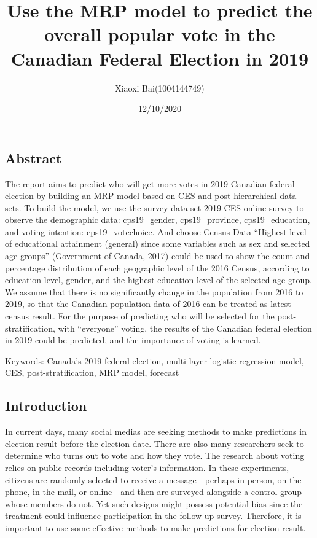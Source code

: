 \documentclass[
]{article}
\title{Use the MRP model to predict the overall popular vote in the Canadian
Federal Election in 2019}
\author{Xiaoxi Bai(1004144749)}
\date{12/10/2020}
\begin{document}
\maketitle

\hypertarget{abstract}{%
\subsection{Abstract}\label{abstract}}

The report aims to predict who will get more votes in 2019 Canadian
federal election by building an MRP model based on CES and
post-hierarchical data sets. To build the model, we use the survey data
set 2019 CES online survey to observe the demographic data:
cps19\_gender, cps19\_province, cps19\_education, and voting intention:
cps19\_votechoice. And choose Census Data ``Highest level of educational
attainment (general) since some variables such as sex and selected age
groups'' (Government of Canada, 2017) could be used to show the count
and percentage distribution of each geographic level of the 2016 Census,
according to education level, gender, and the highest education level of
the selected age group. We assume that there is no significantly change
in the population from 2016 to 2019, so that the Canadian population
data of 2016 can be treated as latest census result. For the purpose of
predicting who will be selected for the post-stratification, with
``everyone'' voting, the results of the Canadian federal election in
2019 could be predicted, and the importance of voting is learned.

Keywords: Canada's 2019 federal election, multi-layer logistic
regression model, CES, post-stratification, MRP model, forecast

\hypertarget{introduction}{%
\subsection{Introduction}\label{introduction}}

In current days, many social medias are seeking methods to make
predictions in election result before the election date. There are also
many researchers seek to determine who turns out to vote and how they
vote. The research about voting relies on public records including
voter's information. In these experiments, citizens are randomly
selected to receive a message---perhaps in person, on the phone, in the
mail, or online---and then are surveyed alongside a control group whose
members do not. Yet such designs might possess potential bias since the
treatment could influence participation in the follow-up survey.
Therefore, it is important to use some effective methods to make
predictions for election result.
\end{document}
